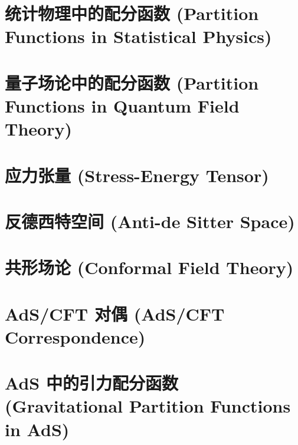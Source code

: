 \documentclass[lang=cn,10pt,chinese]{elegantbook}
\begin{document}
\chapter{统计物理中的配分函数 (Partition Functions in Statistical Physics)}



\chapter{量子场论中的配分函数 (Partition Functions in Quantum Field Theory)}



\chapter{应力张量 (Stress-Energy Tensor)}



\chapter{反德西特空间 (Anti-de Sitter Space)}



\chapter{共形场论 (Conformal Field Theory)}



\chapter{AdS/CFT 对偶 (AdS/CFT Correspondence)}



\chapter{AdS 中的引力配分函数 (Gravitational Partition Functions in AdS)}


\end{document}
